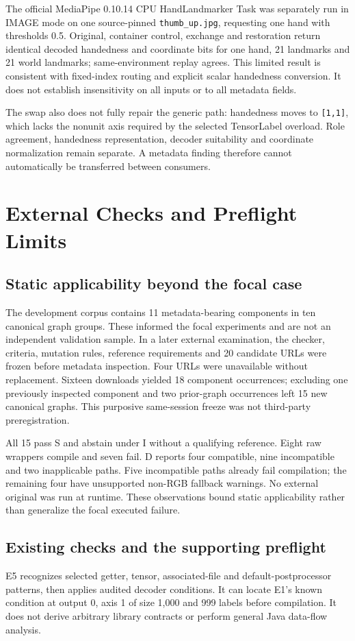 \documentclass[10pt,conference]{IEEEtran}
\newcommand{\code}[1]{\texttt{#1}}
\begin{document}
The official MediaPipe 0.10.14 CPU HandLandmarker Task was separately run in IMAGE mode on one source-pinned \code{thumb\_up.jpg}, requesting one hand with thresholds 0.5. Original, container control, exchange and restoration return identical decoded handedness and coordinate bits for one hand, 21 landmarks and 21 world landmarks; same-environment replay agrees. This limited result is consistent with fixed-index routing and explicit scalar handedness conversion. It does not establish insensitivity on all inputs or to all metadata fields.

The swap also does not fully repair the generic path: handedness moves to \code{[1,1]}, which lacks the nonunit axis required by the selected TensorLabel overload. Role agreement, handedness representation, decoder suitability and coordinate normalization remain separate. A metadata finding therefore cannot automatically be transferred between consumers.

\section{External Checks and Preflight Limits}
\label{sec:preflight}
\subsection{Static applicability beyond the focal case}
The development corpus contains 11 metadata-bearing components in ten canonical graph groups. These informed the focal experiments and are not an independent validation sample. In a later external examination, the checker, criteria, mutation rules, reference requirements and 20 candidate URLs were frozen before metadata inspection. Four URLs were unavailable without replacement. Sixteen downloads yielded 18 component occurrences; excluding one previously inspected component and two prior-graph occurrences left 15 new canonical graphs. This purposive same-session freeze was not third-party preregistration.

All 15 pass S and abstain under I without a qualifying reference. Eight raw wrappers compile and seven fail. D reports four compatible, nine incompatible and two inapplicable paths. Five incompatible paths already fail compilation; the remaining four have unsupported non-RGB fallback warnings. No external original was run at runtime. These observations bound static applicability rather than generalize the focal executed failure.

\subsection{Existing checks and the supporting preflight}
E5 recognizes selected getter, tensor, associated-file and default-postprocessor patterns, then applies audited decoder conditions. It can locate E1's known condition at output 0, axis 1 of size 1,000 and 999 labels before compilation. It does not derive arbitrary library contracts or perform general Java data-flow analysis.
\end{document}
